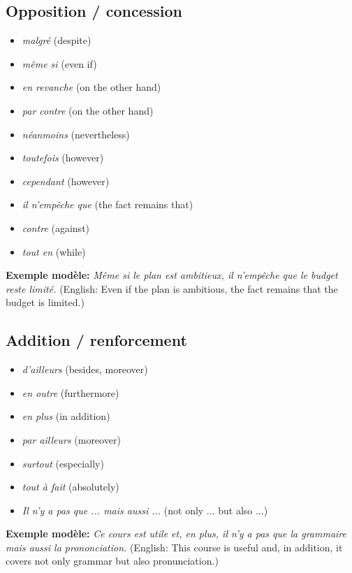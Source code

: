 \documentclass{article}
\begin{document}
\subsection{Opposition / concession}
\begin{itemize}
    \item \textit{malgré} (despite)
    \item \textit{même si} (even if)
    \item \textit{en revanche} (on the other hand)
    \item \textit{par contre} (on the other hand)
    \item \textit{néanmoins} (nevertheless)
    \item \textit{toutefois} (however)
    \item \textit{cependant} (however)
    \item \textit{il n'empêche que} (the fact remains that)
    \item \textit{contre} (against)
    \item \textit{tout en} (while)
\end{itemize}
\textbf{Exemple modèle:} \textit{Même si le plan est ambitieux, il n'empêche que le budget reste limité.} (English: Even if the plan is ambitious, the fact remains that the budget is limited.)

\subsection{Addition / renforcement}
\begin{itemize}
    \item \textit{d'ailleurs} (besides, moreover)
    \item \textit{en outre} (furthermore)
    \item \textit{en plus} (in addition)
    \item \textit{par ailleurs} (moreover)
    \item \textit{surtout} (especially)
    \item \textit{tout à fait} (absolutely)
    \item \textit{Il n'y a pas que ... mais aussi ...} (not only ... but also ...)
\end{itemize}
\textbf{Exemple modèle:} \textit{Ce cours est utile et, en plus, il n'y a pas que la grammaire mais aussi la prononciation.} (English: This course is useful and, in addition, it covers not only grammar but also pronunciation.)
\end{document}
